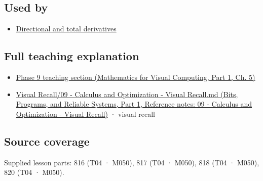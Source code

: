 \subsection{Used by}\label{appendix-677b59746ae0-used-by}

\hypertarget{appendix-677b59746ae0-used-by}{}

\begin{itemize}
\tightlist
\item
  \hyperref[appendix-e2d476574aab]{Directional and total derivatives}
\end{itemize}

\subsection{Full teaching explanation}\label{appendix-677b59746ae0-full-teaching-explanation}

\hypertarget{appendix-677b59746ae0-full-teaching-explanation}{}

\begin{itemize}
\tightlist
\item
  \href{../02-Mathematics-for-Visual-Computing-P01/main.pdf\#02-foundations-ii-ch021-multivariable-derivatives-and-sensitivity-1}{Phase 9 teaching section (Mathematics for Visual Computing, Part 1, Ch. 5)}
\item
  \href{../01-Bits-Programs-and-Reliable-Systems-P01/main.pdf\#appendix-adf48f5dc5c1}{Visual Recall/09 - Calculus and Optimization - Visual Recall.md (Bits, Programs, and Reliable Systems, Part 1, Reference notes: 09 - Calculus and Optimization - Visual Recall)} · visual recall
\end{itemize}

\subsection{Source coverage}\label{appendix-677b59746ae0-source-coverage}

\hypertarget{appendix-677b59746ae0-source-coverage}{}

Supplied lesson parts: 816 (T04 · M050), 817 (T04 · M050), 818 (T04 · M050), 820 (T04 · M050).
